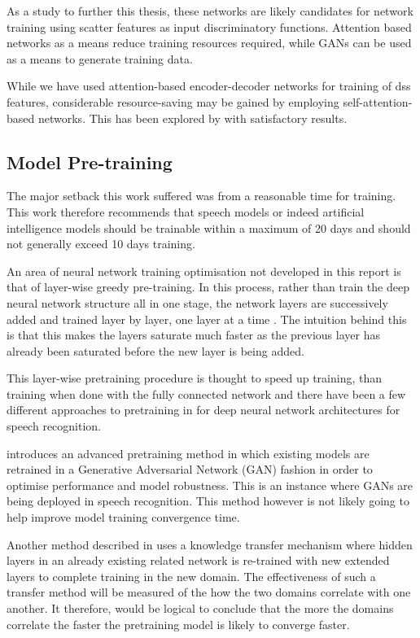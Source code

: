 As a study to further this thesis, these networks are likely candidates for network training using scatter features as input discriminatory functions.  Attention based networks as a means reduce training resources required, while GANs can be used as a means to generate training data.

While we have used attention-based encoder-decoder networks for training of \acrshort{dss} features, considerable resource-saving may be gained by employing self-attention-based networks.  This has been explored by  \cite{salazar2019self} with satisfactory results.

\subsection{Model Pre-training}
The major setback this work suffered was from a reasonable time for training.  This work therefore recommends that speech models or indeed artificial intelligence models should be trainable within a maximum of 20 days and should not generally exceed 10 days training.

An area of neural network training optimisation not developed in this report is that of layer-wise greedy pre-training.  In this process, rather than train the deep neural network structure all in one stage, the network layers are successively added and trained layer by layer, one layer at a time \citep{Goodfellow-et-al-2016}.  The intuition behind this is that this makes the layers saturate much faster as the previous layer has already been saturated before the new layer is being added.

This layer-wise pretraining procedure is thought to speed up training, than training when done with the fully connected network and there have been a few different approaches to pretraining in for deep neural network architectures for speech recognition. 

\cite{hendrycks2019using} introduces an advanced pretraining method in which existing models are retrained in a Generative Adversarial Network (GAN) fashion in order to optimise performance and model robustness.  This is an instance where GANs are being deployed in speech recognition.  This method however is not likely going to help improve model training convergence time.

Another method described in \citep{ramachandran2016unsupervised,} uses a knowledge transfer mechanism where hidden layers in an already existing related network is re-trained with new extended layers to complete training in the new domain.  The effectiveness of such a transfer method will be measured of the how the two domains correlate with one another. It therefore, would be logical to conclude that the more the domains correlate the faster the pretraining model is likely to converge faster.

